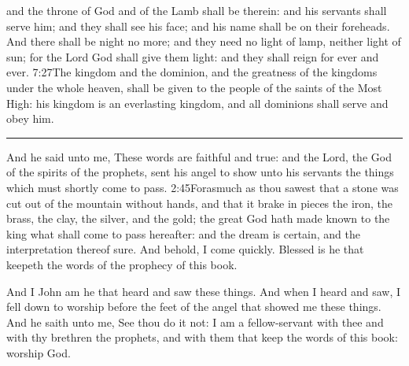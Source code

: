 and the throne of God and of the Lamb shall be therein: and his servants shall serve him; 
and they shall see his face;%
and his name shall be on their foreheads. 
And there shall be night no more; and they need no light of lamp, neither light of sun; for the Lord God shall give them light:%
and they shall reign for ever and ever.%
					{7:27}{The kingdom and the dominion, and the greatness of the kingdoms under the whole heaven, shall be given to the people of the saints of the Most High: his kingdom is an everlasting kingdom, and all dominions shall serve and obey him.} %

\fancybreak*{* * *}

And he said unto me, These words are faithful and true: and the Lord, the God of the spirits of the prophets, sent his angel to show unto his servants the things which must shortly come to pass.%
			{2:45}{Forasmuch as thou sawest that a stone was cut out of the mountain without hands, and that it brake in pieces the iron, the brass, the clay, the silver, and the gold; the great God hath made known to the king what shall come to pass hereafter: and the dream is certain, and the interpretation thereof sure.} %
And behold, I come quickly.%
Blessed is he that keepeth the words of the prophecy of this book.

And I John am he that heard and saw these things. And when I heard and saw, I fell down to worship before the feet of the angel that showed me these things. 
And he saith unto me, See thou do it not: I am a fellow-servant with thee and with thy brethren the prophets, and with them that keep the words of this book: worship God.

